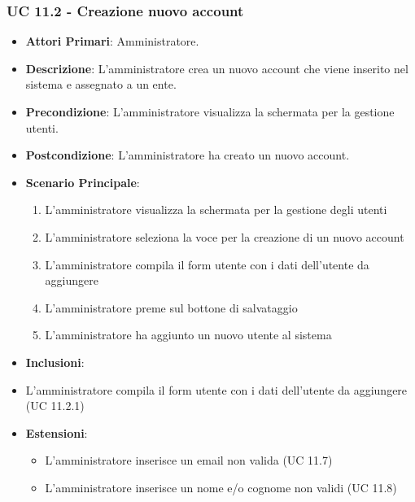 			\subsubsection{UC 11.2 - Creazione nuovo account}
			\begin{itemize}
				\item \textbf{Attori Primari}: Amministratore.
				\item \textbf{Descrizione}: L'amministratore crea un nuovo account che viene inserito nel sistema e assegnato a un ente.
				\item \textbf{Precondizione}: L'amministratore visualizza la schermata per la gestione utenti.
				\item \textbf{Postcondizione}: L'amministratore ha creato un nuovo account.
				\item \textbf{Scenario Principale}:
				\begin{enumerate}
					\item{L'amministratore visualizza la schermata per la gestione degli utenti}
					\item{L'amministratore seleziona la voce per la creazione di un nuovo account}
					\item{L'amministratore compila il form utente con i dati dell'utente da aggiungere}
					\item{L'amministratore preme sul bottone di salvataggio}
					\item{L'amministratore ha aggiunto un nuovo utente al sistema}
				\end{enumerate}	
				\item \textbf{Inclusioni}:
					\item L'amministratore compila il form utente con i dati dell'utente da aggiungere (UC 11.2.1)
				\item \textbf{Estensioni}:
				\begin{itemize}
					\item L'amministratore inserisce un email non valida (UC 11.7)
					\item L'amministratore inserisce un nome e/o cognome non validi (UC 11.8)
				\end{itemize}
			\end{itemize}
			
